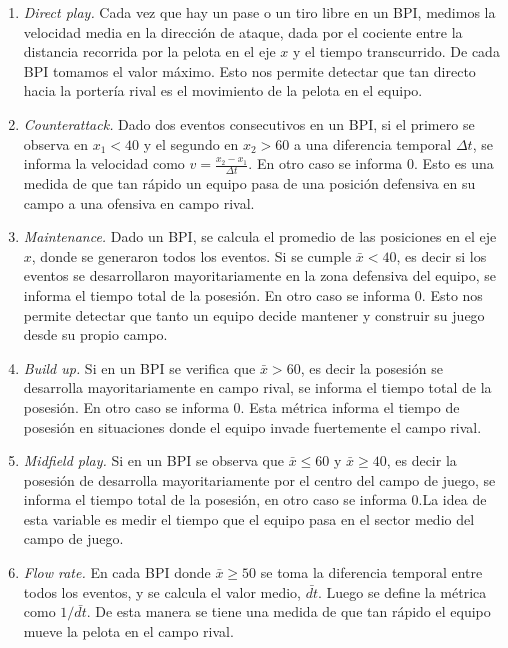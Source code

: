 \documentclass[]{article}
\begin{document}
\begin{enumerate}
    \item {\it Direct play.} Cada vez que hay un pase o un tiro libre en un BPI, medimos la velocidad media en la dirección de ataque, dada por el cociente entre la distancia recorrida por la pelota en el eje $x$ y el tiempo transcurrido. De cada BPI tomamos el valor máximo. 
    Esto nos permite detectar que tan directo hacia la portería rival es el movimiento de la pelota en el equipo.

    \item {\it Counterattack.} Dado dos eventos consecutivos en un BPI, si el primero se observa en $x_1<40$ y el segundo en $x_2>60$ a una diferencia temporal $\Delta t$, se informa la velocidad como $v=\frac{x_2-x_1}{\Delta t}$. En otro caso se informa $0$.
    Esto es una medida de que tan rápido un equipo pasa de una posición defensiva en su campo a una ofensiva en campo rival.

    \item {\it Maintenance.} Dado un BPI, se calcula el promedio de las posiciones en el eje $x$, donde se generaron todos los eventos. Si se cumple $\bar{x}<40$, es decir si los eventos se desarrollaron mayoritariamente en la zona defensiva del equipo,
    se informa el tiempo total de la posesión. En otro caso se informa $0$. Esto nos permite detectar que tanto un equipo decide mantener y construir su juego desde su propio campo.

    \item {\it Build up.} Si en un BPI se verifica que $\bar{x}>60$, es decir la posesión se desarrolla mayoritariamente en campo rival, se informa el tiempo total de la posesión. En otro caso se informa $0$. Esta métrica informa el tiempo de posesión en situaciones donde el equipo invade fuertemente el campo rival.   

    \item {\it Midfield play.} Si en un BPI se observa que $\bar{x}\leq60$ y $\bar{x}\geq40$, es decir la posesión de desarrolla mayoritariamente por el centro del campo de juego, se informa el tiempo total de la posesión, en otro caso se informa $0$.La idea de esta variable es medir el tiempo que el equipo pasa en el sector medio del campo de juego.

    \item {\it Flow rate.} En cada BPI donde $\bar{x}\geq50$ se toma la diferencia temporal entre todos los eventos, y se calcula el valor medio, $\bar{dt}$. Luego se define la métrica como $1/\bar{dt}$. De esta manera se tiene una medida de que tan rápido el equipo mueve la pelota en el campo rival.


\end{enumerate}
\end{document}

